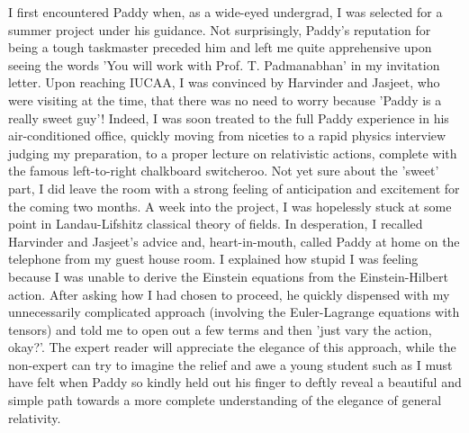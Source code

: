 \documentclass[prd, preprint, longbibliography, 11pt]{revtex4-1}
\begin{document}
I first encountered Paddy when, as a wide-eyed undergrad, I was selected for a summer project under his guidance. Not surprisingly, Paddy's reputation for being a tough taskmaster preceded him and left me quite apprehensive upon seeing the words 'You will work with Prof. T. Padmanabhan' in my invitation letter. Upon reaching IUCAA, I was convinced by Harvinder and Jasjeet, who were visiting at the time, that there was no need to worry because 'Paddy is a really sweet guy'! Indeed, I was soon treated to the full Paddy experience in his air-conditioned office, quickly moving from niceties to a rapid physics interview judging my preparation, to a proper lecture on relativistic actions, complete with the famous left-to-right chalkboard switcheroo. Not yet sure about the 'sweet' part, I did leave the room with a strong feeling of anticipation and excitement for the coming two months. A week into the project, I was hopelessly stuck at some point in Landau-Lifshitz classical theory of fields. In desperation, I recalled Harvinder and Jasjeet's advice and, heart-in-mouth, called Paddy at home on the telephone from my guest house room. I explained how stupid I was feeling because I was unable to derive the Einstein equations from the Einstein-Hilbert action. After asking how I had chosen to proceed, he quickly dispensed with my unnecessarily complicated approach (involving the Euler-Lagrange equations with tensors) and told me to open out a few terms and then 'just vary the action, okay?'. The expert reader will appreciate the elegance of this approach, while the non-expert can try to imagine the relief and awe a young student such as I must have felt when Paddy so kindly held out his finger to deftly reveal a beautiful and simple path towards a more complete understanding of the elegance of general relativity.
\end{document}
